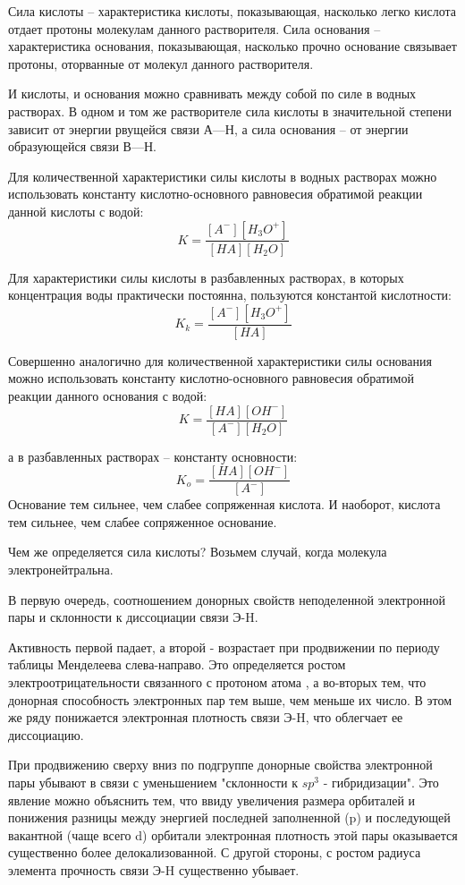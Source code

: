 \documentclass[14pt,a4paper]{scrartcl}
\begin{document}
Сила кислоты – характеристика кислоты, показывающая, насколько легко кислота отдает протоны молекулам данного растворителя.
Сила основания – характеристика основания, показывающая, насколько прочно основание связывает протоны, оторванные от молекул данного растворителя.

 И кислоты, и основания можно сравнивать между собой по силе в водных растворах. В одном и том же растворителе сила кислоты в значительной степени зависит от энергии рвущейся связи А—Н, а сила основания – от энергии образующейся связи В—Н.

Для количественной характеристики силы кислоты в водных растворах можно использовать константу кислотно-основного равновесия обратимой реакции данной кислоты с водой: 
$$K = \frac{\left[A^-\right]\left[H_3O^+\right]}{\left[HA\right]\left[H_2O\right]}$$

Для характеристики силы кислоты в разбавленных растворах, в которых концентрация воды практически постоянна, пользуются константой кислотности: 
$$K_k = \frac{\left[A^-\right]\left[H_3O^+\right]}{\left[HA\right]}$$

Совершенно аналогично для количественной характеристики силы основания можно использовать константу кислотно-основного равновесия обратимой реакции данного основания с водой:
$$K = \frac{\left[HA\right]\left[OH^-\right]}{\left[A^-\right]\left[H_2O\right]}$$

а в разбавленных растворах – константу основности: 
$$K_o = \frac{\left[HA\right]\left[OH^-\right]}{\left[A^-\right]}$$
Основание тем сильнее, чем слабее сопряженная кислота. И наоборот, кислота тем сильнее, чем слабее сопряженное основание.

Чем же определяется сила кислоты? Возьмем случай, когда молекула электронейтральна.

В первую очередь, соотношением донорных свойств неподеленной электронной пары и склонности к диссоциации связи Э-H.

Активность первой падает, а второй - возрастает при продвижении по периоду таблицы Менделеева слева-направо. Это определяется ростом электроотрицательности связанного с протоном атома , а во-вторых тем, что донорная способность электронных пар тем выше, чем меньше их число. В этом же ряду понижается электронная плотность связи Э-H, что облегчает ее диссоциацию.

При продвижению сверху вниз по подгруппе донорные свойства электронной пары убывают в связи с уменьшением "склонности к $sp^3$ - гибридизации". Это явление можно объяснить тем, что ввиду увеличения размера орбиталей и понижения разницы между энергией последней заполненной (p) и последующей вакантной (чаще всего d) орбитали электронная плотность этой пары оказывается существенно более делокализованной. С другой стороны, с ростом радиуса элемента прочность связи Э-H существенно убывает.
\end{document}
